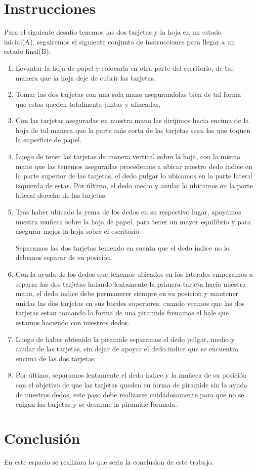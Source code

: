 \documentclass{article}
\begin{document}
\section{Instrucciones} \label{contenido}
\noindent
Para el siguiente desafio tenemos las dos tarjetas y la hoja en un estado inicial(A), seguiremos el siguiente conjunto de instrucciones para llegar a un estado final(B). 
\begin{enumerate}

\item Levantar la hoja de papel y colocarla en otra parte del escritorio, de tal manera que la hoja deje de cubrir las tarjetas.

\item Tomar las dos tarjetas con una sola mano asegurandolas bien de tal forma que estas queden totalmente juntas y alineadas. 

\item Con las tarjetas aseguradas en nuestra mano las dirijimos hacia encima de la hoja de tal manera que la parte más corta de las tarjetas sean las que toquen la superficie de papel.

\item Luego de tener las tarjetas de manera vertical sobre la hoja, con la misma mano que las tenemos aseguradas procedemos a ubicar nuestro dedo indice en la parte superior de las tarjetas, el dedo pulgar lo ubicamos en la parte lateral izquierda de estas. Por último, el dedo medio y anular lo ubicamos en la parte lateral derecha de las tarjetas.

\item Tras haber ubicado la yema de los dedos en su respectivo lugar, apoyamos nuestra muñeca sobre la hoja de papel, para tener un mayor equilibrio y para asegurar mejor la hoja sobre el escritorio.

\itme Separamos las dos tarjetas teniendo en cuenta que el dedo indice no lo debemos separar de su posición.

\item Con la ayuda de los dedos que tenemos ubicados en los laterales empezamos a separar las dos tarjetas halando lentamente la primera tarjeta hacia nuestra mano, el dedo indice debe permanecer siempre en su posicion y mantener unidas las dos tarjetas en sus bordes superiores, cuando veamos que las dos tarjetas estan tomando la forma de una piramide frenamos el hale que estamos haciendo con nuestros dedos.

\item Luego de haber obtenido la piramide separamos el dedo pulgar, medio y anular de las tarjetas, sin dejar de apoyar el dedo indice que se encuentra encima de las dos tarjetas.

\item Por último, separamos lentamente el dedo indice y la muñeca de su posición con el objetivo de que las tarjetas queden en forma de piramide sin la ayuda de nuestros dedos, este paso debe realizarse cuidadosamente para que no se caigan las tarjetas y se desarme la piramide formada.  
    
\end{enumerate}


\section{Conclusión} \label{conclulsion}
\noindent
En este espacio se realizara lo que seria la conclusion de este trabajo.
\end{document}
